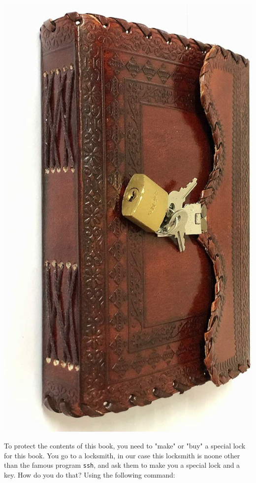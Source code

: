     \begin{minipage}{\linewidth}
        \centering
        \includegraphics*[scale=0.12]{./Figures/GIT/Using_a_deploy_key/Book_with_a_lock.jpg}
        \captionsetup{type=figure}
        \label{fig:UaDK_Book_with_a_key}
    \end{minipage}

    To protect the contents of this book, you need to "make" or "buy" a special lock for this book. You go to a locksmith, in our case this locksmith is noone other than the famous program \texttt{ssh}, and ask them to make you a special lock and a key. How do you do that? Using the following command:

